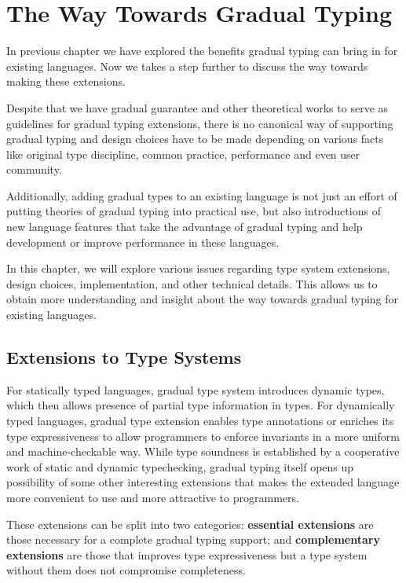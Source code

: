 
\section{The Way Towards Gradual Typing}

In previous chapter we have explored the benefits gradual typing
can bring in for existing languages.
Now we takes a step further to discuss the way towards making these extensions.

Despite that we have gradual guarantee\cite{siek2015refined} and other
theoretical works to serve as guidelines for gradual typing extensions,
there is no canonical way of supporting gradual typing
and design choices have to be made
depending on various facts like original type discipline, common practice, performance and even user community.

Additionally, adding gradual types to an existing language
is not just an effort of putting theories of gradual typing into practical use,
but also introductions of new language features
that take the advantage of gradual typing
and help development or improve performance in these languages.

In this chapter, we will explore various issues regarding
type system extensions, design choices,
implementation, and other technical details.
This allows us to obtain more understanding and insight about the way towards gradual typing for existing languages.

\subsection{Extensions to Type Systems}

For statically typed languages, gradual type system introduces
dynamic types, which then allows presence of partial type information
in types.
For dynamically typed languages, gradual type extension
enables type annotations or enriches its type expressiveness
to allow programmers to enforce invariants in a more uniform and
machine-checkable way.
While type soundness is established by a cooperative work
of static and dynamic typechecking,
gradual typing itself opens up possibility of some other interesting extensions
that makes the extended language more convenient to use and more attractive to programmers.

These extensions can be split into two categories:
\textbf{essential extensions} are those necessary
for a complete gradual typing support;
and \textbf{complementary extensions} are those that improves type expressiveness
but a type system without them does not compromise completeness.

